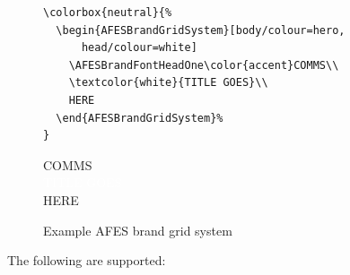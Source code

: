 \documentclass[a4paper]{l3doc}
\begin{document}
\begin{figure}
  \begin{lstlisting}
\colorbox{neutral}{%
  \begin{AFESBrandGridSystem}[body/colour=hero,
      head/colour=white]
    \AFESBrandFontHeadOne\color{accent}COMMS\\
    \textcolor{white}{TITLE GOES}\\
    HERE
  \end{AFESBrandGridSystem}%
}
  \end{lstlisting}
  
  \setlength{\fboxsep}{5mm}%
  \colorbox{neutral}{%
    \begin{AFESBrandGridSystem}[body/colour=hero,
        head/colour=white, head/width=\dimexpr\linewidth-1cm]
      \AFESBrandFontHeadOne\color{accent}COMMS\\
      \textcolor{white}{TITLE GOES}\\
      HERE
    \end{AFESBrandGridSystem}%
  }
  \caption{Example AFES brand grid system}\label{gridsystem}
\end{figure}

The following  are supported:
\end{document}
